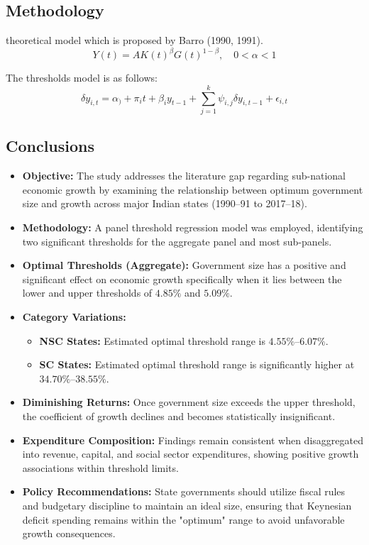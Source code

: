 \documentclass[10pt, oneside]{article}
\begin{document}
\subsection{Methodology}
theoretical model which is proposed by Barro (1990, 1991).
$$
	Y(t) = AK(t)^\beta G(t)^{1-\beta}, \quad 0< \alpha < 1
$$

The thresholds model is as follows:
$$
	\delta y_{i,t} = \alpha_) + \pi_i t + \beta_i y_{t-1} + \sum^k_{j=1} \psi_{i,j} \delta y_{i,t-1} + \epsilon_{i,t}
$$

\subsection{Conclusions}
\begin{itemize}
	\item \textbf{Objective:} The study addresses the literature gap regarding sub-national economic growth by examining the relationship between optimum government size and growth across major Indian states (1990--91 to 2017--18).
	\item \textbf{Methodology:} A panel threshold regression model was employed, identifying two significant thresholds for the aggregate panel and most sub-panels.
	\item \textbf{Optimal Thresholds (Aggregate):} Government size has a positive and significant effect on economic growth specifically when it lies between the lower and upper thresholds of $4.85\%$ and $5.09\%$.
	\item \textbf{Category Variations:}
	      \begin{itemize}
		      \item \textbf{NSC States:} Estimated optimal threshold range is $4.55\%$--$6.07\%$.
		      \item \textbf{SC States:} Estimated optimal threshold range is significantly higher at $34.70\%$--$38.55\%$.
	      \end{itemize}
	\item \textbf{Diminishing Returns:} Once government size exceeds the upper threshold, the coefficient of growth declines and becomes statistically insignificant.
	\item \textbf{Expenditure Composition:} Findings remain consistent when disaggregated into revenue, capital, and social sector expenditures, showing positive growth associations within threshold limits.
	\item \textbf{Policy Recommendations:} State governments should utilize fiscal rules and budgetary discipline to maintain an ideal size, ensuring that Keynesian deficit spending remains within the "optimum" range to avoid unfavorable growth consequences.
\end{itemize}
\end{document}
